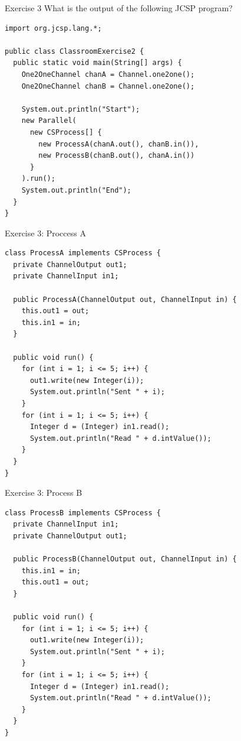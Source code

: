 \begin{frame}[fragile]{Exercise 3}
  What is the output of the following JCSP program?


\begin{lstlisting}[basicstyle=\fontsize{9}{11}\selectfont\ttfamily]
import org.jcsp.lang.*;

public class ClassroomExercise2 {
  public static void main(String[] args) {
    One2OneChannel chanA = Channel.one2one();
    One2OneChannel chanB = Channel.one2one();

    System.out.println("Start");
    new Parallel(
      new CSProcess[] { 
        new ProcessA(chanA.out(), chanB.in()),
        new ProcessB(chanB.out(), chanA.in()) 
      }
    ).run();
    System.out.println("End");
  }
}
\end{lstlisting}
\end{frame}

\begin{frame}[fragile]{Exercise 3: Proccess A}
\begin{lstlisting}[basicstyle=\fontsize{9}{11}\selectfont\ttfamily]
class ProcessA implements CSProcess {
  private ChannelOutput out1;
  private ChannelInput in1;

  public ProcessA(ChannelOutput out, ChannelInput in) {
    this.out1 = out;
    this.in1 = in;
  }

  public void run() {
    for (int i = 1; i <= 5; i++) {
      out1.write(new Integer(i));
      System.out.println("Sent " + i);
    }
    for (int i = 1; i <= 5; i++) {
      Integer d = (Integer) in1.read();
      System.out.println("Read " + d.intValue());
    }
  }
}
\end{lstlisting}
\end{frame}

\begin{frame}[fragile]{Exercise 3: Process B}
\begin{lstlisting}[basicstyle=\fontsize{9}{11}\selectfont\ttfamily]
class ProcessB implements CSProcess {
  private ChannelInput in1;
  private ChannelOutput out1;

  public ProcessB(ChannelOutput out, ChannelInput in) {
    this.in1 = in;
    this.out1 = out;
  }

  public void run() {
    for (int i = 1; i <= 5; i++) {
      out1.write(new Integer(i));
      System.out.println("Sent " + i);
    }
    for (int i = 1; i <= 5; i++) {
      Integer d = (Integer) in1.read();
      System.out.println("Read " + d.intValue());
    }
  }
}
\end{lstlisting}
\end{frame}

